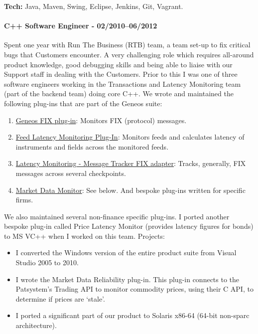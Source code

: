 \documentclass[
  a4paper,
]{article}
\providecommand{\tightlist}{%
  \setlength{\itemsep}{0pt}\setlength{\parskip}{0pt}}
\begin{document}
\textbf{Tech:} Java, Maven, Swing, Eclipse, Jenkins, Git, Vagrant.

\hypertarget{c-software-engineer---022010062012}{%
\paragraph{C++ Software Engineer -
02/2010--06/2012}\label{c-software-engineer---022010062012}}

Spent one year with Run The Business (RTB) team, a team set-up to fix
critical bugs that Customers encounter. A very challenging role which
requires all-around product knowledge, good debugging skills and being
able to liaise with our Support staff in dealing with the Customers.
Prior to this I was one of three software engineers working in the
Transactions and Latency Monitoring team (part of the backend team)
doing core C++. We wrote and maintained the following plug-ins that are
part of the Geneos suite:

\begin{enumerate}
\def\labelenumi{\arabic{enumi}.}
\tightlist
\item
  \href{https://docs.itrsgroup.com/docs/geneos/5.1.0/Netprobe/trading_fix/fix.html}{Geneos
  FIX plug-in}: Monitors FIX (protocol) messages.
\item
  \href{https://docs.itrsgroup.com/docs/geneos/5.2.0/Netprobe/market_data_monitoring/feedadapter_ug.html}{Feed
  Latency Monitoring Plug-In}: Monitors feeds and calculates latency of
  instruments and fields across the monitored feeds.
\item
  \href{https://docs.itrsgroup.com/docs/geneos/5.2.0/Netprobe/latency_monitoring/message_tracker/fix_adapter.html}{Latency
  Monitoring - Message Tracker FIX adapter}: Tracks, generally, FIX
  messages across several checkpoints.
\item
  \href{https://docs.itrsgroup.com/docs/geneos/5.2.0/Netprobe/market_data_monitoring/mdm_ug.html}{Market
  Data Monitor}: See below. And bespoke plug-ins written for specific
  firms.
\end{enumerate}

We also maintained several non-finance specific plug-ins. I ported
another bespoke plug-in called Price Latency Monitor (provides latency
figures for bonds) to MS VC++ when I worked on this team. Projects:

\begin{itemize}
\tightlist
\item
  I converted the Windows version of the entire product suite from
  Visual Studio 2005 to 2010.
\item
  I wrote the Market Data Reliability plug-in. This plug-in connects to
  the Patsystem's Trading API to monitor commodity prices, using their C
  API, to determine if prices are `stale'.
\item
  I ported a significant part of our product to Solaris x86-64 (64-bit
  non-sparc architecture).
\end{itemize}
\end{document}
